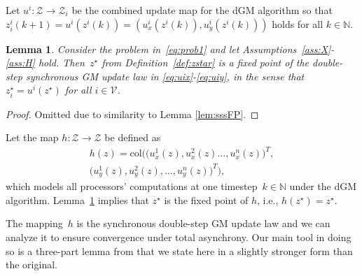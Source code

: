 \documentclass[9pt,shortpaper,twoside,web]{ieeecolor}
\newcommand{\X}{\ensuremath{\mathcal{X}}\xspace}
\newcommand{\Z}{\ensuremath{\mathcal{Z}}\xspace}
\newcommand{\V}{\ensuremath{\mathcal{V}}\xspace}
\newtheorem{lemma}{Lemma}
\begin{document}
%

Let $u^i:\Z\rightarrow\Z_i$ be the combined update map for the dGM algorithm so 
that $z^i_i(k+1) = u^i(z^i(k))= ( u^i_x(z^i(k)),u^i_y(z^i(k)))$ holds for all $k\in\mathbb N$.


\begin{lemma}\label{lem:dGMfp}
    Consider the problem in~\eqref{eq:prob1}
    and let Assumptions~\ref{ass:X}-\ref{ass:H} hold. 
    Then~$z^\star$ from Definition~\ref{def:zstar}
    is a fixed point of the double-step synchronous GM update law in \eqref{eq:uix}-\eqref{eq:uiy}, in the sense that $z^\star_i=u^i(z^\star)$ for all $i\in\V$.
\end{lemma}
\begin{proof}
    Omitted due to similarity to Lemma \ref{lem:sssFP}.
\end{proof}

Let the map $h:\Z\rightarrow \Z$ be defined as
\begin{multline}\label{eq:h}
    h(z) = \text{col}\Big(\big(u^1_x(z),u^2_x(z) \dots, u^n_x(z)\big)^T,\\ \big(u^1_y(z),u^2_y(z),\dots, u^n_y(z)\big)^T\Big),
\end{multline}
which models all processors' computations at one timestep~$k\in\mathbb N$ under the dGM algorithm.
Lemma~\ref{lem:dGMfp} implies that $z^\star$ is the fixed point of $h$, i.e., $h(z^{\star}) = z^{\star}$. 

The mapping~$h$ is the synchronous double-step GM update law and we can analyze
it to ensure convergence under total asynchrony. 
Our main tool in doing so is a three-part lemma from \cite{bertsekas1989parallel}
that we state here in a slightly stronger form than the original. 
\end{document}
